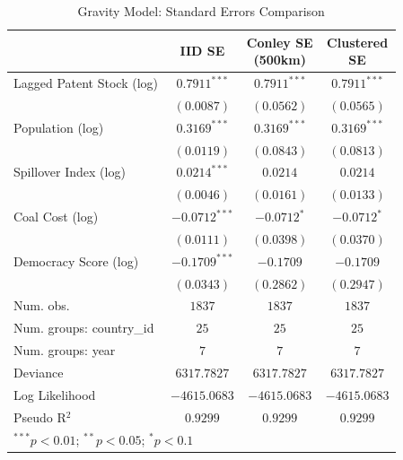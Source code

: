 
\begin{table}
\begin{center}
\begin{footnotesize}
\begin{tabular}{l@{} c@{} c@{} c@{}}
\toprule
 & IID SE & \shortstack{Conley SE\\(500km)} & \shortstack{Clustered\\SE} \\
\midrule
Lagged Patent Stock (log) & $0.7911^{***}$  & $0.7911^{***}$ & $0.7911^{***}$ \\
                          & $(0.0087)$      & $(0.0562)$     & $(0.0565)$     \\
Population (log)          & $0.3169^{***}$  & $0.3169^{***}$ & $0.3169^{***}$ \\
                          & $(0.0119)$      & $(0.0843)$     & $(0.0813)$     \\
Spillover Index (log)     & $0.0214^{***}$  & $0.0214$       & $0.0214$       \\
                          & $(0.0046)$      & $(0.0161)$     & $(0.0133)$     \\
Coal Cost (log)           & $-0.0712^{***}$ & $-0.0712^{*}$  & $-0.0712^{*}$  \\
                          & $(0.0111)$      & $(0.0398)$     & $(0.0370)$     \\
Democracy Score (log)     & $-0.1709^{***}$ & $-0.1709$      & $-0.1709$      \\
                          & $(0.0343)$      & $(0.2862)$     & $(0.2947)$     \\
\midrule
Num. obs.                 & $1837$          & $1837$         & $1837$         \\
Num. groups: country\_id  & $25$            & $25$           & $25$           \\
Num. groups: year         & $7$             & $7$            & $7$            \\
Deviance                  & $6317.7827$     & $6317.7827$    & $6317.7827$    \\
Log Likelihood            & $-4615.0683$    & $-4615.0683$   & $-4615.0683$   \\
Pseudo R$^2$              & $0.9299$        & $0.9299$       & $0.9299$       \\
\bottomrule
\multicolumn{4}{l}{\tiny{$^{***}p<0.01$; $^{**}p<0.05$; $^{*}p<0.1$}}
\end{tabular}
\end{footnotesize}
\caption{Gravity Model: Standard Errors Comparison}
\label{tab:conley}
\end{center}
\end{table}
